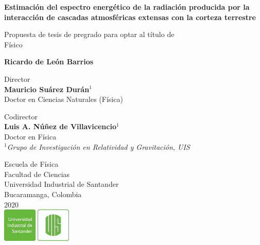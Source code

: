 \documentclass[12pt]{report}
\begin{document}
\begin{titlepage}
   \begin{center}
       \vspace*{1cm}
       
       
       \large
       \textbf{Estimación del espectro energético de la radiación producida por la interacción de cascadas atmosféricas extensas con la corteza terrestre}
       
 
       \vspace{1.5cm}
 
       \small
       Propuesta de tesis de pregrado para optar al título de \\
       Físico
       
       
       \normalsize
       \textbf{Ricardo de León Barrios}
       
       \small
       \vspace{1cm}
       Director\\
       \textbf{Mauricio Suárez Durán}$^1$\\
       Doctor en Ciencias Naturales (Física)
       
       \vspace{1cm}
       Codirector\\
       \textbf{Luis A. Núñez de Villavicencio}$^1$\\
       Doctor en Física\\
       
       \vspace{1cm}
       $^1$\textit{Grupo de Investigación en Relatividad y Gravitación, UIS}
 
       \vfill
       
       
 
 
       
 
       \small
       Escuela de Física\\
       Facultad de Ciencias\\
       Universidad Industrial de Santander\\
       Bucaramanga, Colombia\\
       2020\\
       \vspace{0.3cm}
       \includegraphics[width=0.25\textwidth]{logo/logoUIS.png}
 
   \end{center}
\end{titlepage}
\end{document}
